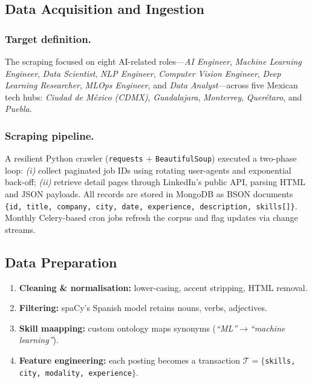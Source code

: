 \documentclass[runningheads]{llncs}
\begin{document}
\subsection{Data Acquisition and Ingestion}
\label{ssec:data_acquisition}

\subsubsection{Target definition.}
The scraping focused on eight AI-related roles—\emph{AI Engineer}, \emph{Machine Learning Engineer}, \emph{Data Scientist}, \emph{NLP Engineer}, \emph{Computer Vision Engineer}, \emph{Deep Learning Researcher}, \emph{MLOps Engineer}, and \emph{Data Analyst}—across five Mexican tech hubs: \emph{Ciudad de México (CDMX)}, \emph{Guadalajara}, \emph{Monterrey}, \emph{Querétaro}, and \emph{Puebla}.


\subsubsection{Scraping pipeline.}
A resilient Python crawler (\texttt{requests} + \texttt{BeautifulSoup}) executed a two-phase loop:  
\emph{(i)} collect paginated job IDs using rotating user-agents and exponential back-off;  
\emph{(ii)} retrieve detail pages through LinkedIn’s public API, parsing HTML and JSON payloads.  
All records are stored in MongoDB as BSON documents
\verb|{id, title, company, city, date, experience, description, skills[]}|.  
Monthly Celery-based cron jobs refresh the corpus and flag updates via change streams.

\subsection{Data Preparation}
\label{ssec:data_prep}

\begin{enumerate}[leftmargin=*]
	\item \textbf{Cleaning \& normalisation:} lower-casing, accent stripping, HTML removal.
	\item \textbf{Filtering:} spaCy’s Spanish model retains nouns, verbs, adjectives.
	\item \textbf{Skill maapping:} custom ontology maps synonyms (\textit{“ML”}$\rightarrow$\textit{“machine learning”}).
	\item \textbf{Feature engineering:} each posting becomes a transaction
	$\mathcal{T}=\{$\texttt{skills, city, modality, experience}$\}$.
\end{enumerate}
\end{document}
